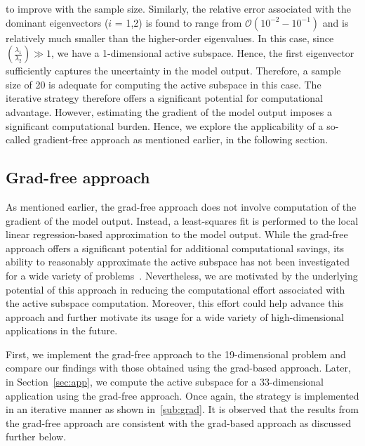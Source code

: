to improve with the sample size. Similarly, the relative error associated with the dominant eigenvectors
($i$ = 1,2) is found to range from $\mathcal{O}(10^{-2} - 10^{-1})$ and is relatively much smaller than 
the higher-order eigenvalues. In this case, since $\left(\frac{\lambda_1}{\lambda_2}\right)\gg 1$, we have
a 1-dimensional active subspace. Hence, the first eigenvector sufficiently captures the uncertainty in
the  model output. Therefore, a sample size of 20 is adequate for computing the active subspace in this
case. The iterative strategy therefore offers a significant potential for computational advantage. 
However, estimating the gradient of the model output imposes a significant computational burden.
Hence, we explore the applicability of a so-called gradient-free approach as mentioned earlier, in the
following section.  

\subsection{Grad-free approach}
\label{sub:gradfree}

As mentioned earlier, the grad-free approach does not involve computation of the gradient of the model
output. Instead, a least-squares fit is performed to the local linear regression-based approximation
to the model output. While the grad-free approach offers a significant potential for additional 
computational savings, its ability to reasonably approximate the active subspace 
has not been investigated for a wide variety of problems~\cite{Constantine:2015}. Nevertheless, we are motivated by the
underlying potential of this approach in reducing the computational effort associated with the
active subspace computation. Moreover, this effort could help advance this approach and further motivate
its usage for a wide variety of high-dimensional applications in the future. 

First, we implement the grad-free approach to the 19-dimensional problem and compare our findings with
those obtained using the grad-based approach. Later, in
Section~\ref{sec:app}, we compute the active subspace for a 33-dimensional application using the grad-free
approach. Once again, the strategy is implemented in an iterative manner as shown in~\ref{sub:grad}. 
It is observed that the results from the grad-free approach are consistent with the grad-based approach
as discussed further below.

